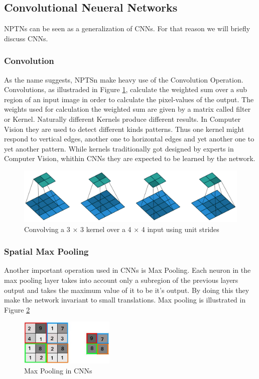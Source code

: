 \documentclass{llncs}
\begin{document}
\subsection{Convolutional Neueral Networks}
NPTNs can be seen as a generalization of CNNs. For that reason we will briefly discuss CNNs.
\subsubsection{Convolution}
As the name suggests, NPTSn make heavy use of the Convolution Operation. Convolutions, as illustraded in Figure \ref{fig:conv}, calculate the weighted sum over a sub region of an input image in order to calculate the pixel-values of the output. The weights used for calculation the weighted sum are given by a matrix called filter or Kernel. Naturally different Kernels produce different results. In Computer Vision they are used to detect different kinds patterns. Thus one kernel might respond to vertical edges, another  one to horizontal edges and yet another one to yet another pattern. While kernels traditionally got designed by experts in Computer Vision, whithin CNNs they are expected to be learned by the network.

\begin{figure}
	\begin{center}
		\includegraphics[width=\textwidth]{result_images/Conv.png}
		\caption{Convolving a 3 × 3 kernel over a 4 × 4 input using unit strides}
		\label{fig:conv}
	\end{center}
\end{figure}

\subsubsection{Spatial Max Pooling}
Another important operation used in CNNs is Max Pooling.
Each neuron in the max pooling layer takes into account only a subregion of the previous
layers output and takes the maximum value of it to be it's output. By doing this they make the network invariant to small translations. Max pooling is illustrated in Figure \ref{fig:maxpooling}

\begin{figure}
	\begin{center}
		\includegraphics[width=0.40\textwidth]{result_images/maxpooling.jpg}
		\caption{Max Pooling in CNNs}
		\label{fig:maxpooling}
	\end{center}
\end{figure}
\end{document}

